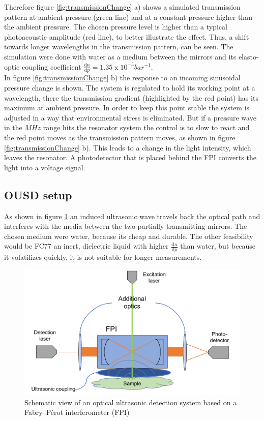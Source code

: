 Therefore figure \ref{fig:transmissionChange} a) shows a simulated transmission pattern at ambient pressure (green line) and at a constant pressure higher than the ambient pressure. The chosen pressure level is higher than a typical photoacoustic amplitude (red line), to better illustrate the effect. Thus, a shift towards longer wavelengths in the transmission pattern, can be seen. The simulation were done with water as a medium between the mirrors and its elasto-optic coupling coefficient $\frac{\mathrm{d}n}{\mathrm{d}p} = 1.35\; \mathrm{x} \;10^{-5} bar^{-1}$.\\
In figure \ref{fig:transmissionChange} b) the response to an incoming sinusoidal pressure change is shown. The system is regulated to hold its working point at a wavelength, there the transmission gradient (highlighted by the red point) has its maximum at ambient pressure. In order to keep this point stable the system is adjusted in a way that environmental stress is eliminated. But if a pressure wave in the $MHz$ range hits the resonator system the control is to slow to react and the red point moves as the transmission pattern moves, as shown in figure \ref{fig:transmissionChange} b). This leads to a change in the light intensity, which leaves the resonator. A photodetector that is placed behind the FPI converts the light into a voltage signal. 

\subsection{OUSD setup}

As shown in figure \ref{fig:FPIschematic} an induced ultrasonic wave travels back the optical path and interferes with the media between the two partially transmitting mirrors. The chosen medium were water, because its cheap and durable. The other feasibility would be FC77 an inert, dielectric liquid with higher $\frac{\mathrm{d}n}{\mathrm{d}p}$ than water, but because it volatilizes quickly, it is not suitable for longer measurements. 

\begin{figure}[H]
	\centering
	\includegraphics[height=0.4\textheight]{05_OUSD/images/FPIschematic.png}
	\caption{Schematic view of an optical ultrasonic detection system based on a Fabry–P\'{e}rot interferometer (FPI)}
	\label{fig:FPIschematic}
\end{figure} 

